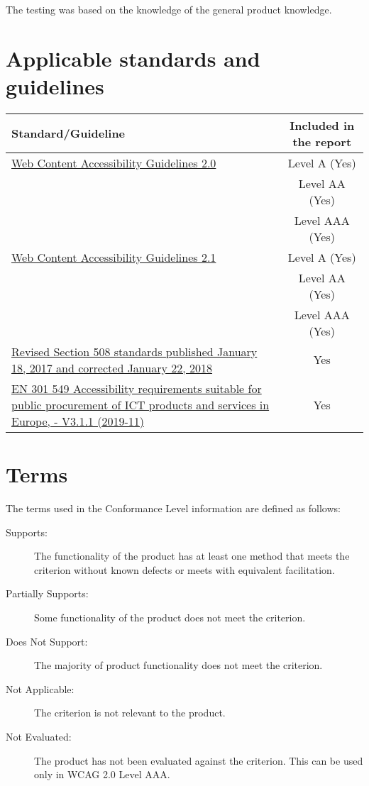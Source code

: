 \documentclass{report}
\begin{document}
The testing was based on the knowledge of the general product
knowledge.

\section{Applicable standards and guidelines}
\label{sec:standards}

{\centering
\begin{tabularx}{\textwidth}{Xc}
  \toprule
  Standard/Guideline  & Included in the report\\
  \midrule
  \href{http://www.w3.org/TR/2008/REC-WCAG20-20081211}{Web Content
  Accessibility Guidelines 2.0} & Level A (Yes) \\
                      & Level AA (Yes)\\
                      & Level AAA (Yes)\\
  \href{https://www.w3.org/TR/WCAG21}{Web Content Accessibility
  Guidelines 2.1} & Level A (Yes) \\
                      & Level AA (Yes)\\
                      & Level AAA (Yes)\\
  \href{https://www.access-board.gov/guidelines-and-standards/communications-and-it/about-the-ict-refresh/final-rule/text-of-the-standards-and-guidelines}{Revised Section 508 standards published January 18, 2017 and
  corrected January 22, 2018} & Yes\\
  \href{https://www.etsi.org/deliver/etsi_en/301500_301599/301549/03.01.01_60/en_301549v030101p.pdf}{EN
  301 549 Accessibility requirements suitable for public procurement
  of ICT products and services in Europe, - V3.1.1 (2019-11)} & Yes\\
  \bottomrule
\end{tabularx}
\par}

\section{Terms}
\label{sec:terms}

The terms used in the Conformance Level information are defined as follows:
\begin{description}
\item[Supports:] The functionality of the product has at least one
  method that meets the criterion without known defects or meets with
  equivalent facilitation.
\item[Partially Supports:] Some functionality of the product does not
  meet the criterion.
\item[Does Not Support:] The majority of product functionality does
  not meet the criterion.
\item[Not Applicable:] The criterion is not relevant to the product.
\item[Not Evaluated:] The product has not been evaluated against the
  criterion. This can be used only in WCAG 2.0 Level AAA.

\end{description}
\end{document}
